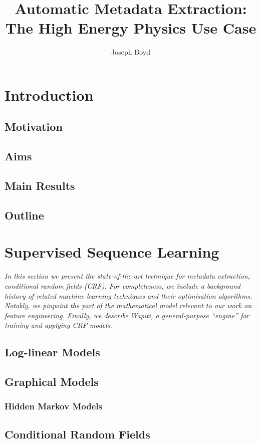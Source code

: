 \documentclass[10pt, oneside]{scrartcl}   	%
\title{Automatic Metadata Extraction: The High Energy Physics Use Case}
\author{Joseph Boyd}
\begin{document}
\maketitle

\tableofcontents

\section{Introduction} %

\subsection{Motivation}
\subsection{Aims}
\subsection{Main Results}
\subsection{Outline}
\section{Supervised Sequence Learning}
\emph{In this section we present the state-of-the-art technique for metadata extraction, conditional random fields (CRF). For completeness, we include a background history of related machine learning techniques and their optimisation algorithms. Notably, we pinpoint the part of the mathematical model relevant to our work on feature engineering. Finally, we describe Wapiti, a general-purpose ``engine'' for training and applying CRF models.}
\subsection{Log-linear Models}
\subsection{Graphical Models}
\subsubsection{Hidden Markov Models}
\subsection{Conditional Random Fields}
\end{document}
